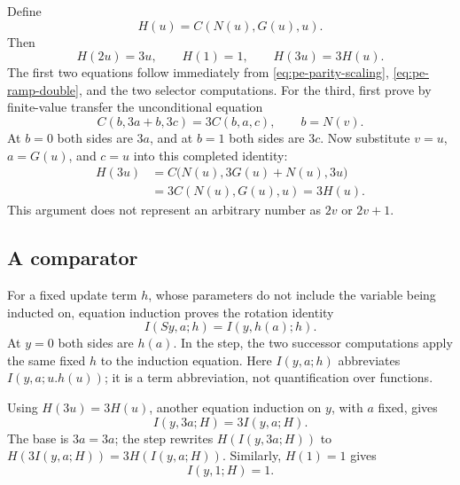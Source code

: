 Define
\[
 H(u)=C(N(u),G(u),u).
\]
Then
\begin{equation}
 H(2u)=3u,\qquad H(1)=1,\qquad H(3u)=3H(u).
 \label{eq:pe-factor}
\end{equation}
The first two equations follow immediately from
\eqref{eq:pe-parity-scaling}, \eqref{eq:pe-ramp-double}, and the two
selector computations.  For the third, first prove by finite-value
transfer the unconditional equation
\begin{equation}
 C(b,3a+b,3c)=3C(b,a,c),\qquad b=N(v).
 \label{eq:pe-factor-finite}
\end{equation}
At $b=0$ both sides are $3a$, and at $b=1$ both sides are $3c$.
Now substitute $v=u$, $a=G(u)$, and $c=u$ into this completed identity:
\begin{align*}
 H(3u)
 &=C\bigl(N(u),3G(u)+N(u),3u\bigr)\\
 &=3C(N(u),G(u),u)=3H(u).
\end{align*}
This argument does not represent an arbitrary number as $2v$ or $2v+1$.

\subsection{A comparator}

For a fixed update term $h$, whose parameters do not include the variable
being inducted on, equation induction proves the rotation identity
\begin{equation}
 I(Sy,a;h)=I(y,h(a);h).
 \label{eq:pe-rotation}
\end{equation}
At $y=0$ both sides are $h(a)$.  In the step, the two successor
computations apply the same fixed $h$ to the induction equation.
Here $I(y,a;h)$ abbreviates $I(y,a;u.h(u))$; it is a term abbreviation,
not quantification over functions.

Using $H(3u)=3H(u)$, another equation induction on $y$, with $a$ fixed,
gives
\begin{equation}
 I(y,3a;H)=3I(y,a;H).
 \label{eq:pe-orbit-scaling}
\end{equation}
The base is $3a=3a$; the step rewrites
$H(I(y,3a;H))$ to $H(3I(y,a;H))=3H(I(y,a;H))$.
Similarly, $H(1)=1$ gives
\begin{equation}
 I(y,1;H)=1.\label{eq:pe-orbit-one}
\end{equation}

